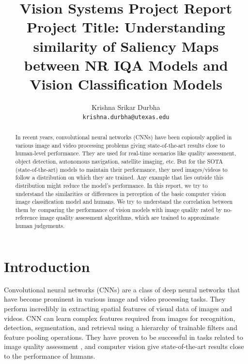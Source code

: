 \documentclass[10pt,twocolumn,letterpaper]{article}
\begin{document}
\title{Vision Systems Project Report\\
Project Title: Understanding similarity of Saliency Maps between NR IQA Models and Vision Classification Models}

\author{Krishna Srikar Durbha\\
{\tt\small krishna.durbha@utexas.edu}
}
\maketitle

\begin{abstract}
In recent years, convolutional neural networks (CNNs) have been copiously applied in various image and video processing problems giving state-of-the-art results close to human-level performance. They are used for real-time scenarios like quality assessment, object detection, autonomous navigation, satellite imaging, etc. But for the SOTA (state-of-the-art) models to maintain their performance, they need images/videos to follow a distribution on which they are trained. Any example that lies outside this distribution might reduce the model's performance. In this report, we try to understand the similarities or differences in perception of the basic computer vision image classification model and humans.
We try to understand the correlation between them by comparing the performance of vision models with image quality rated by no-reference image quality assessment algorithms, which are trained to approximate human judgements.
\end{abstract}


\section{Introduction}
\label{sec:intro}
Convolutional neural networks (CNNs) are a class of deep neural networks that have become prominent in various image and video processing tasks. They perform incredibly in extracting spatial features of visual data of images and videos. CNN can learn complex features required from images for recognition, detection, segmentation, and retrieval using a hierarchy of trainable filters and feature pooling operations. They have proven to be successful in tasks related to image quality assessment \cite{PaQ-2-PiQ}, and computer vision \cite{ImageNet} give state-of-the-art results close to the performance of humans.\\
\end{document}
